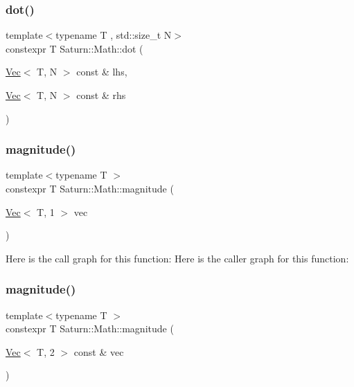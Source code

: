 \mbox{\label{namespace_saturn_1_1_math_a7c8ea659a38c4bdb2ce585c988a38c5d}} 
\subsubsection{\texorpdfstring{dot()}{dot()}}
{\footnotesize\ttfamily template$<$typename T , std\+::size\+\_\+t N$>$ \\
constexpr T Saturn\+::\+Math\+::dot (\begin{DoxyParamCaption}\item[{\mbox{\hyperlink{class_saturn_1_1_math_1_1_vec}{Vec}}$<$ T, N $>$ const \&}]{lhs,  }\item[{\mbox{\hyperlink{class_saturn_1_1_math_1_1_vec}{Vec}}$<$ T, N $>$ const \&}]{rhs }\end{DoxyParamCaption})}

\mbox{\label{namespace_saturn_1_1_math_a49cbe141235991de0c3f8a2988f90304}} 
\subsubsection{\texorpdfstring{magnitude()}{magnitude()}\hspace{0.1cm}{\footnotesize\ttfamily [1/4]}}
{\footnotesize\ttfamily template$<$typename T $>$ \\
constexpr T Saturn\+::\+Math\+::magnitude (\begin{DoxyParamCaption}\item[{\mbox{\hyperlink{class_saturn_1_1_math_1_1_vec}{Vec}}$<$ T, 1 $>$}]{vec }\end{DoxyParamCaption})}

Here is the call graph for this function\+:
Here is the caller graph for this function\+:
\mbox{\label{namespace_saturn_1_1_math_aa4fb0ab62076735134a237c374ab4dc4}} 
\subsubsection{\texorpdfstring{magnitude()}{magnitude()}\hspace{0.1cm}{\footnotesize\ttfamily [2/4]}}
{\footnotesize\ttfamily template$<$typename T $>$ \\
constexpr T Saturn\+::\+Math\+::magnitude (\begin{DoxyParamCaption}\item[{\mbox{\hyperlink{class_saturn_1_1_math_1_1_vec}{Vec}}$<$ T, 2 $>$ const \&}]{vec }\end{DoxyParamCaption})}

